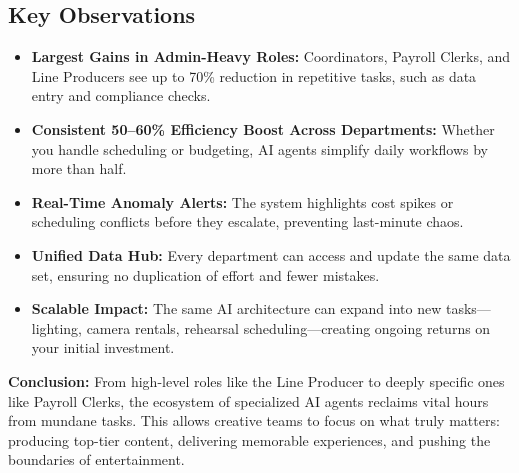 \documentclass[11pt]{article}
\begin{document}
\subsection{Key Observations}
\begin{itemize}
    \item \textbf{Largest Gains in Admin-Heavy Roles:} Coordinators, Payroll Clerks, and Line Producers see up to 70\% reduction in repetitive tasks, such as data entry and compliance checks.
    \item \textbf{Consistent 50--60\% Efficiency Boost Across Departments:} Whether you handle scheduling or budgeting, AI agents simplify daily workflows by more than half.
    \item \textbf{Real-Time Anomaly Alerts:} The system highlights cost spikes or scheduling conflicts before they escalate, preventing last-minute chaos.
    \item \textbf{Unified Data Hub:} Every department can access and update the same data set, ensuring no duplication of effort and fewer mistakes.
    \item \textbf{Scalable Impact:} The same AI architecture can expand into new tasks—lighting, camera rentals, rehearsal scheduling—creating ongoing returns on your initial investment.
\end{itemize}

\bigskip
\noindent
\textbf{Conclusion:}
From high-level roles like the Line Producer to deeply specific ones like Payroll Clerks, the ecosystem of specialized AI agents reclaims vital hours from mundane tasks. This allows creative teams to focus on what truly matters: producing top-tier content, delivering memorable experiences, and pushing the boundaries of entertainment.
\end{document}
